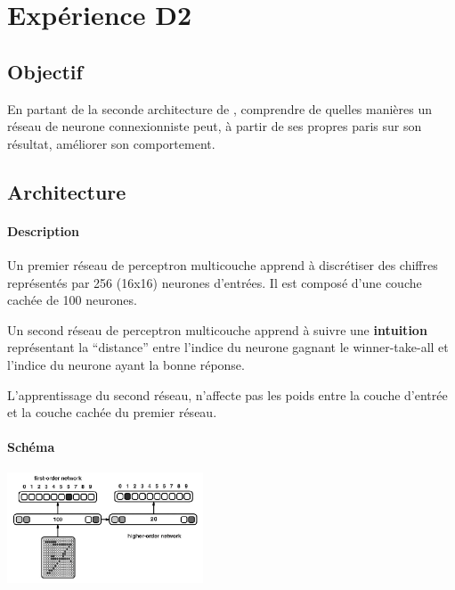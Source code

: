 \section{Expérience D2} \label{expD2}
  \subsection{Objectif}
    En partant de la seconde architecture de \cite{Cleeremans_2007}, 
    comprendre de quelles manières un réseau de neurone connexionniste peut, à partir de ses propres paris
    sur son résultat, améliorer son comportement.
  
  
  \subsection{Architecture}
    \paragraph{Description}
      Un premier réseau de perceptron multicouche apprend à discrétiser des chiffres représentés
      par 256 (16x16) neurones d'entrées. Il est composé d'une couche cachée de 100 neurones.
      
      Un second réseau de perceptron multicouche apprend à suivre une \textbf{intuition}
      représentant la ``distance'' entre l'indice du neurone gagnant le winner-take-all et l'indice
      du neurone ayant la bonne réponse.
      
      L'apprentissage du second réseau, n'affecte pas les poids entre la couche d'entrée et la 
      couche cachée du premier réseau.
    \paragraph{Schéma}
      \begin{center}
	\includegraphics[width=220px]{data/expD2/schema.png}
      \end{center}
      
